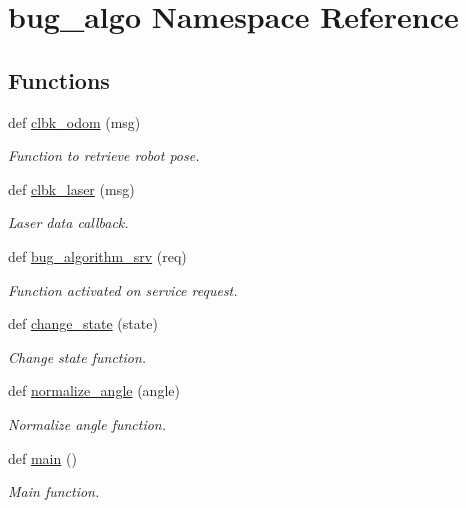 \hypertarget{namespacebug__algo}{}\section{bug\+\_\+algo Namespace Reference}
\label{namespacebug__algo}
\subsection*{Functions}
\begin{DoxyCompactItemize}
\item 
def \hyperlink{namespacebug__algo_a6a72a118f8a289bf80b1fe79487b273f}{clbk\+\_\+odom} (msg)
\begin{DoxyCompactList}\small\item\em Function to retrieve robot pose. \end{DoxyCompactList}\item 
def \hyperlink{namespacebug__algo_a4363ca4faa041280e958c5141bc3bde8}{clbk\+\_\+laser} (msg)
\begin{DoxyCompactList}\small\item\em Laser data callback. \end{DoxyCompactList}\item 
def \hyperlink{namespacebug__algo_afe2965502b3ec1efdb6ac2dadfb9a5de}{bug\+\_\+algorithm\+\_\+srv} (req)
\begin{DoxyCompactList}\small\item\em Function activated on service request. \end{DoxyCompactList}\item 
def \hyperlink{namespacebug__algo_aca287deda75aa8d0f790135ef47b6a16}{change\+\_\+state} (state)
\begin{DoxyCompactList}\small\item\em Change state function. \end{DoxyCompactList}\item 
def \hyperlink{namespacebug__algo_ae499da57d8d88a30b64054480fdb60c8}{normalize\+\_\+angle} (angle)
\begin{DoxyCompactList}\small\item\em Normalize angle function. \end{DoxyCompactList}\item 
def \hyperlink{namespacebug__algo_a8df2ef2049aa935d5478597523b50dcb}{main} ()
\begin{DoxyCompactList}\small\item\em Main function. \end{DoxyCompactList}\end{DoxyCompactItemize}
